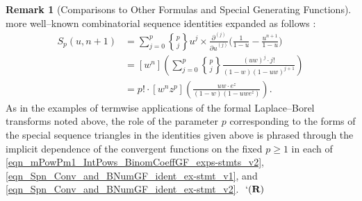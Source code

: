\documentclass[12pt,reqno]{article}
\numberwithin{sfootnote}{section}
\numberwithin{equation}{section}
\theoremstyle{DefaultTheoremStyle}
\theoremstyle{definition}
\newtheorem{remark}[theorem]{Remark}
\newcommand{\eolqedsymbol}[1]{{\hrulefill\ensuremath{\ #1}}}
\renewcommand{\eolqedsymbol}[1]{{\mboxfill{ }\ensuremath{\ #1}}}
\newcommand{\RemarkQEDSymbol}{`(\text{\rm{\bf R}})}
\newcommand{\RemarkQED}{\eolqedsymbol{\RemarkQEDSymbol}}
\newcommand{\gkpSII}[2]{\ensuremath{\genfrac{\{}{\}}{0pt}{}{#1}{#2}}}
\begin{document}
\begin{remark}[Comparisons to Other Formulas and Special Generating Functions]
more well--known combinatorial sequence identities expanded as follows 
\citep[\S 26.8]{NISTHB} \citep[\S 7.4]{GKP}: 
\begin{align*} 
S_p(u, n+1) & = 
     \sum_{j=0}^{p} \gkpSII{p}{j} u^{j} \times 
     \frac{\partial^{(j)}}{{\partial u}^{(j)}} 
     \Biggl( 
     \frac{1}{1-u} - \frac{u^{n+1}}{1-u} 
     \Biggr) \\ 
   & = 
     [w^{n}] \left( 
     \sum_{j=0}^{p} \gkpSII{p}{j} \frac{(uw)^{j} \cdot j!}{(1-w) (1-uw)^{j+1}} 
     \right) \\ 
   & = 
     p! \cdot [w^{n} z^{p}] \left( 
     \frac{uw \cdot e^{z}}{(1-w) (1 - uw e^{z})} 
     \right). 
\end{align*} 
As in the examples of termwise applications of the formal 
Laplace--Borel transforms noted above, 
the role of the parameter $p$ corresponding to the forms of the 
special sequence triangles in the identities given above is 
phrased through the implicit dependence of the convergent functions on the 
fixed $p \geq 1$ in each of 
\eqref{eqn_mPowPm1_IntPows_BinomCoeffGF_exps-stmts_v2}, 
\eqref{eqn_Spn_Conv_and_BNumGF_ident_ex-stmt_v1}, and 
\eqref{eqn_Spn_Conv_and_BNumGF_ident_ex-stmt_v2}. 
\RemarkQED 
\end{remark} 
\end{document}
